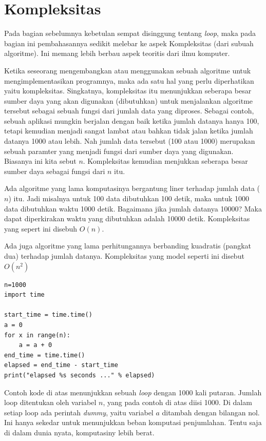 \section{Kompleksitas}
Pada bagian sebelumnya kebetulan sempat disinggung tentang {\em loop},
maka pada bagian ini pembahasannya sedikit melebar ke aspek Kompleksitas
(dari subuah algoritme).
Ini memang lebih berbau aspek teoritis dari ilmu komputer.

Ketika seseorang mengembangkan atau menggunakan sebuah algoritme untuk
mengimplementasikan programnya, maka ada satu hal yang perlu diperhatikan
yaitu kompleksitas.
Singkatnya, kompleksitas itu menunjukkan seberapa besar sumber daya yang
akan digunakan (dibutuhkan) untuk menjalankan algoritme tersebut sebagai
sebuah fungsi dari jumlah data yang diproses.
Sebagai contoh, sebuah aplikasi mungkin berjalan dengan baik ketika jumlah
datanya hanya 100, tetapi kemudian menjadi sangat lambat atau bahkan tidak
jalan ketika jumlah datanya 1000 atau lebih.
Nah jumlah data tersebut (100 atau 1000) merupakan sebuah paramter yang
menjadi fungsi dari sumber daya yang digunakan. Biasanya ini kita sebut $n$.
Kompleksitas kemudian menjukkan seberapa besar sumber daya sebagai fungsi
dari $n$ itu.

Ada algoritme yang lama komputasinya bergantung liner terhadap jumlah data
($n$) itu. Jadi misalnya untuk 100 data dibutuhkan 100 detik, maka untuk
1000 data dibutuhkan waktu 1000 detik. Bagaimana jika jumlah datanya 10000?
Maka dapat diperkirakan waktu yang dibutuhkan adalah 10000 detik.
Kompleksitas yang sepert ini disebuh $O(n)$.

Ada juga algoritme yang lama perhitungannya berbanding kuadratis (pangkat dua)
terhadap jumlah datanya. 
Kompleksitas yang model seperti ini disebut $O(n^{2})$


\begin{verbatim}
n=1000
import time

start_time = time.time()
a = 0
for x in range(n):
    a = a + 0
end_time = time.time()
elapsed = end_time - start_time
print("elapsed %s seconds ..." % elapsed)
\end{verbatim}

Contoh kode di atas menunjukkan sebuah {\em loop} dengan 1000 kali putaran.
Jumlah loop ditentukan oleh variabel $n$, yang pada contoh di atas diisi 1000.
Di dalam setiap loop ada perintah {\em dummy}, yaitu variabel $a$ ditambah
dengan bilangan nol. Ini hanya sekedar untuk menunjukkan beban komputasi penjumlahan.
Tentu saja di dalam dunia nyata, komputasiny lebih berat.

